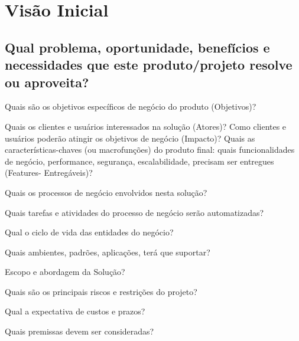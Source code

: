 \chapter{Visão Inicial}

\section{Qual problema, oportunidade, benefícios e necessidades que este produto/projeto resolve ou aproveita?}


Quais são os objetivos específicos de negócio do produto (Objetivos)?

Quais os clientes e usuários interessados na solução (Atores)?
Como clientes e usuários poderão atingir os objetivos de negócio (Impacto)?
Quais as características-chaves (ou macrofunções) do produto final: quais funcionalidades de negócio, performance, segurança, escalabilidade, precisam ser entregues (Features- Entregáveis)?

Quais os processos de negócio envolvidos nesta solução?

Quais tarefas e atividades do processo de negócio serão automatizadas?

Qual o ciclo de vida das entidades do negócio?

Quais ambientes, padrões, aplicações, terá que suportar?

Escopo e abordagem da Solução?

Quais são os principais riscos e restrições do projeto?

Qual a expectativa de custos e prazos?

Quais premissas devem ser consideradas?

